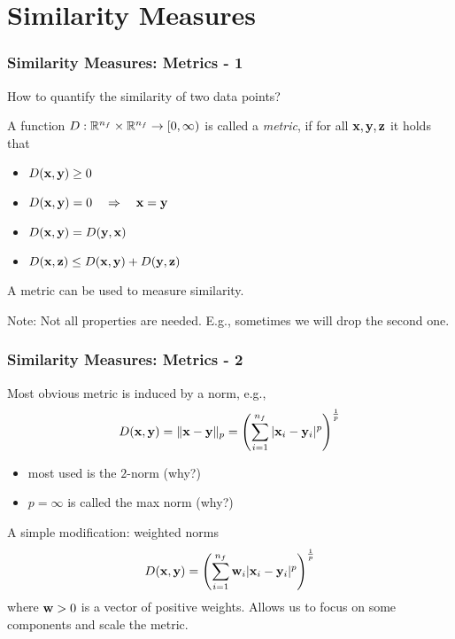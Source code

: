 \documentclass[12pt,handout]{beamer}
\begin{document}


\section{Similarity Measures} %
\label{sec:section_name}

\begin{frame}
\frametitle{Similarity Measures: Metrics - 1}

How to quantify the similarity of two data points?

\bigskip

A function $D : \mathbb{R}^{n_f} \times \mathbb{R}^{n_f} \rightarrow [0,\infty)$ is called a \emph{metric}, if for all ${\bf x},{\bf y},{\bf z}$ it holds that
\begin{itemize}
\item  $D({\bf x},{\bf y}) \ge 0$
\item $D({\bf x},{\bf y}) = 0 \quad \Rightarrow \quad {\bf x} = {\bf y}$
\item $D({\bf x},{\bf y}) = D({\bf y},{\bf x})$
\item $D({\bf x},{\bf z}) \le D({\bf x},{\bf y}) + D({\bf y},{\bf z})$
\end{itemize}	

\bigskip

A metric can be used to measure similarity.

\bigskip

Note: Not all properties are needed. E.g., sometimes we will drop the second one.

\end{frame}

\begin{frame}
\frametitle{Similarity Measures: Metrics - 2}

Most obvious metric is induced by a norm, e.g.,
$$ D({\bf x},{\bf y}) = \|{\bf x} - {\bf y}\|_p = \left( \sum_{i=1}^{n_f} |{\bf x}_i-{\bf y}_i|^p \right)^{\frac 1p} $$

\begin{itemize}
\item most used is the $2$-norm (why?)
\item $p=\infty$ is called the max norm (why?)
\end{itemize}

\bigskip

A simple modification: weighted norms
$$ D({\bf x},{\bf y}) = \left( \sum_{i=1}^{n_f} {\bf w}_i |{\bf x}_i-{\bf y}_i|^p \right)^{\frac 1p} $$
where ${\bf w} >0$ is a vector of positive weights.
Allows us to focus on some components and scale the metric.
\end{frame}
\end{document}
